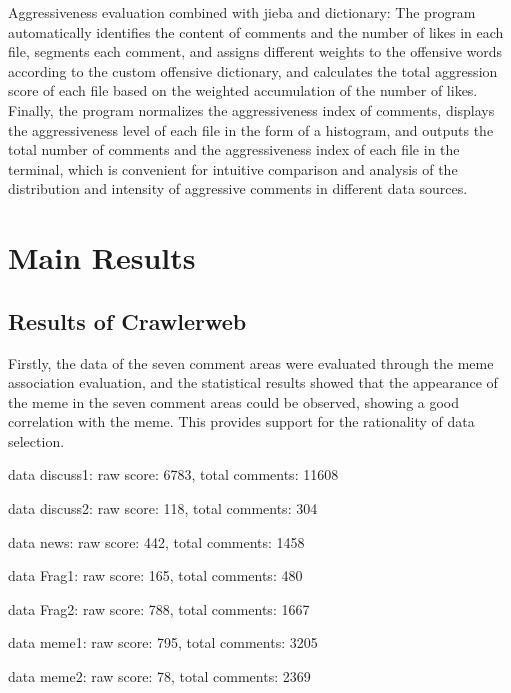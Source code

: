 \documentclass[12pt,a4paper]{ctexart}
\theoremstyle{MyLineTheoremStyle}
\theoremstyle{MyBlockTheoremStyle}
\theoremstyle{MySubsubsectionStyle}
\begin{document}
Aggressiveness evaluation combined with jieba and dictionary: The program automatically identifies the content of comments and the number of likes in each file, segments each comment, and assigns different weights to the offensive words according to the custom offensive dictionary, and calculates the total aggression score of each file based on the weighted accumulation of the number of likes. Finally, the program normalizes the aggressiveness index of comments, displays the aggressiveness level of each file in the form of a histogram, and outputs the total number of comments and the aggressiveness index of each file in the terminal, which is convenient for intuitive comparison and analysis of the distribution and intensity of aggressive comments in different data sources.


\section{Main Results}


\subsection{Results of Crawlerweb}

Firstly, the data of the seven comment areas were evaluated through the meme association evaluation, and the statistical results showed that the appearance of the meme in the seven comment areas could be observed, showing a good correlation with the meme. This provides support for the rationality of data selection.

data discuss1: raw score: 6783, total comments: 11608

data discuss2: raw score: 118, total comments: 304

data news: raw score: 442, total comments: 1458

data Frag1: raw score: 165, total comments: 480

data Frag2: raw score: 788, total comments: 1667

data meme1: raw score: 795, total comments: 3205

data meme2: raw score: 78, total comments: 2369
\end{document}
